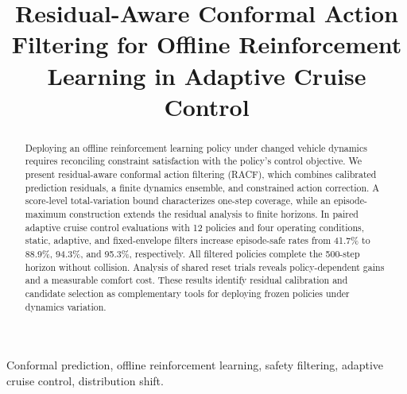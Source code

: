 \documentclass{article}
\newcommand{\AuthorName}{Zelin LI}
\newcommand{\AuthorAffiliation}{Affiliation and e-mail to be completed before submission}
\begin{document}
\ninept
\title{Residual-Aware Conformal Action Filtering for Offline Reinforcement Learning in Adaptive Cruise Control}
\name{\AuthorName}
\address{\AuthorAffiliation}
\maketitle
\begin{abstract}
Deploying an offline reinforcement learning policy under changed vehicle
dynamics requires reconciling constraint satisfaction with the policy's
control objective. We present residual-aware conformal action filtering
(RACF), which combines calibrated prediction residuals, a finite dynamics
ensemble, and constrained action correction. A score-level total-variation
bound characterizes one-step coverage, while an episode-maximum construction
extends the residual analysis to finite horizons. In paired adaptive cruise
control evaluations with 12 policies and four operating conditions, static,
adaptive, and fixed-envelope filters increase episode-safe rates from
41.7\% to 88.9\%, 94.3\%, and 95.3\%, respectively. All filtered policies
complete the 500-step horizon without collision. Analysis of shared reset
trials reveals policy-dependent gains and a measurable comfort cost.
These results identify residual calibration and candidate selection as
complementary tools for deploying frozen policies under dynamics variation.
\end{abstract}
\begin{keywords}
Conformal prediction, offline reinforcement learning, safety filtering,
adaptive cruise control, distribution shift.
\end{keywords}






\clearpage


\end{document}
